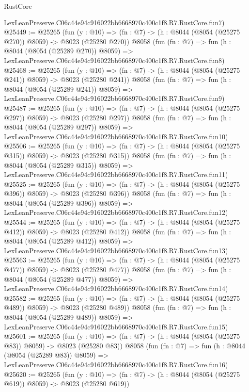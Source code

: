 \begin{lexlean}{RustCore}
\begin{coremodule}
    LexLeanPreserve.C06c44e94c916022bb6668970c400c1f8.R7.RustCore.fun7)
@25449 := @25265
    (fun (y : @10) => (fn : @7) -> (h : @8044 (@8054 (@25275 @270)) @8059) -> @8023 (@25280 @270))
    @8058
    (fun (fn : @7) =>
    fun (h : @8044 (@8054 (@25289 @270)) @8059) =>
    LexLeanPreserve.C06c44e94c916022bb6668970c400c1f8.R7.RustCore.fun8)
@25468 := @25265
    (fun (y : @10) => (fn : @7) -> (h : @8044 (@8054 (@25275 @241)) @8059) -> @8023 (@25280 @241))
    @8058
    (fun (fn : @7) =>
    fun (h : @8044 (@8054 (@25289 @241)) @8059) =>
    LexLeanPreserve.C06c44e94c916022bb6668970c400c1f8.R7.RustCore.fun9)
@25487 := @25265
    (fun (y : @10) => (fn : @7) -> (h : @8044 (@8054 (@25275 @297)) @8059) -> @8023 (@25280 @297))
    @8058
    (fun (fn : @7) =>
    fun (h : @8044 (@8054 (@25289 @297)) @8059) =>
    LexLeanPreserve.C06c44e94c916022bb6668970c400c1f8.R7.RustCore.fun10)
@25506 := @25265
    (fun (y : @10) => (fn : @7) -> (h : @8044 (@8054 (@25275 @315)) @8059) -> @8023 (@25280 @315))
    @8058
    (fun (fn : @7) =>
    fun (h : @8044 (@8054 (@25289 @315)) @8059) =>
    LexLeanPreserve.C06c44e94c916022bb6668970c400c1f8.R7.RustCore.fun11)
@25525 := @25265
    (fun (y : @10) => (fn : @7) -> (h : @8044 (@8054 (@25275 @396)) @8059) -> @8023 (@25280 @396))
    @8058
    (fun (fn : @7) =>
    fun (h : @8044 (@8054 (@25289 @396)) @8059) =>
    LexLeanPreserve.C06c44e94c916022bb6668970c400c1f8.R7.RustCore.fun12)
@25544 := @25265
    (fun (y : @10) => (fn : @7) -> (h : @8044 (@8054 (@25275 @412)) @8059) -> @8023 (@25280 @412))
    @8058
    (fun (fn : @7) =>
    fun (h : @8044 (@8054 (@25289 @412)) @8059) =>
    LexLeanPreserve.C06c44e94c916022bb6668970c400c1f8.R7.RustCore.fun13)
@25563 := @25265
    (fun (y : @10) => (fn : @7) -> (h : @8044 (@8054 (@25275 @477)) @8059) -> @8023 (@25280 @477))
    @8058
    (fun (fn : @7) =>
    fun (h : @8044 (@8054 (@25289 @477)) @8059) =>
    LexLeanPreserve.C06c44e94c916022bb6668970c400c1f8.R7.RustCore.fun14)
@25582 := @25265
    (fun (y : @10) => (fn : @7) -> (h : @8044 (@8054 (@25275 @489)) @8059) -> @8023 (@25280 @489))
    @8058
    (fun (fn : @7) =>
    fun (h : @8044 (@8054 (@25289 @489)) @8059) =>
    LexLeanPreserve.C06c44e94c916022bb6668970c400c1f8.R7.RustCore.fun15)
@25601 := @25265
    (fun (y : @10) => (fn : @7) -> (h : @8044 (@8054 (@25275 @83)) @8059) -> @8023 (@25280 @83))
    @8058
    (fun (fn : @7) =>
    fun (h : @8044 (@8054 (@25289 @83)) @8059) =>
    LexLeanPreserve.C06c44e94c916022bb6668970c400c1f8.R7.RustCore.fun16)
@25620 := @25265
    (fun (y : @10) => (fn : @7) -> (h : @8044 (@8054 (@25275 @619)) @8059) -> @8023 (@25280 @619))

\end{coremodule}
\end{lexlean}
